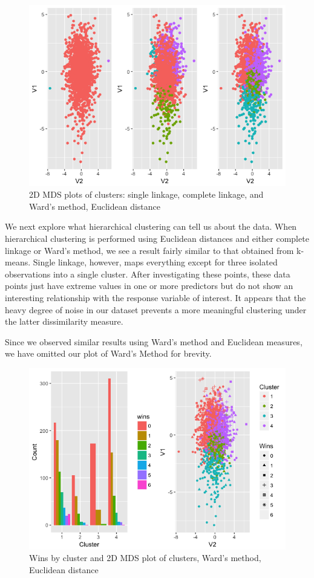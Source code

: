 \documentclass[10pt,a4paper, hidelinks]{article} %
\begin{document}
\begin{figure}[H]
	\centering
	\includegraphics[width=0.5\linewidth]{../fig/areyouheigh}
		\caption{2D MDS plots of clusters: single linkage, complete linkage, and Ward's method, Euclidean distance}
\end{figure}

We next explore what hierarchical clustering can tell us about the data. When hierarchical clustering is performed using Euclidean distances and either complete linkage or Ward's method, we see a result fairly similar to that obtained from k-means.  Single linkage, however, maps everything except for three isolated observations into a single cluster. After investigating these points, these data points just have extreme values in one or more predictors but do not show an interesting relationship with the response variable of interest. It appears that the heavy degree of noise in our dataset prevents a more meaningful clustering under the latter dissimilarity measure.

Since we observed similar results using Ward's method and Euclidean measures, we have omitted our plot of Ward's Method for brevity. 


\begin{figure}[H]
	\centering
	\includegraphics[width=0.7\linewidth]{../fig/ward1}
		\caption{Wins by cluster and 2D MDS plot of clusters, Ward's method, Euclidean distance}
\end{figure}
\end{document}
